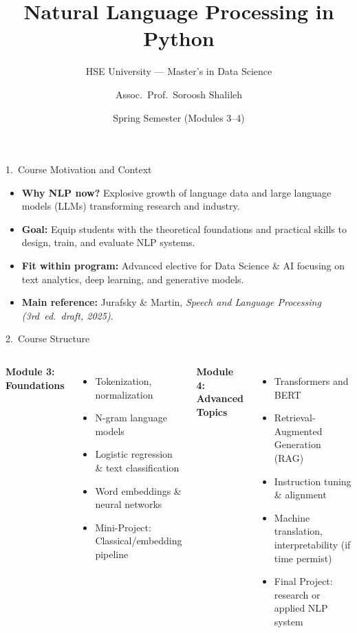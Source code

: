 \documentclass[aspectratio=169]{beamer}
\title[NLP in Python]{\textbf{Natural Language Processing in Python}}
\subtitle{HSE University --- Master’s in Data Science }
\author[Shalileh]{Assoc.\ Prof.\ Soroosh Shalileh}
\institute[HSE \& Sber]{
\inst{2}Higher School of Economics (HSE University)
\and 
\inst{1} Executive director of SberIndex, SberBank
}
\date{Spring Semester (Modules 3--4)}
\begin{document}
\begin{frame}
  \titlepage
\end{frame}

\begin{frame}{1.~Course Motivation and Context}
\begin{itemize}
  \item \textbf{Why NLP now?} Explosive growth of language data and large language models (LLMs) transforming research and industry.
  \item \textbf{Goal:} Equip students with the theoretical foundations and practical skills to design, train, and evaluate NLP systems.
  \item \textbf{Fit within program:} Advanced elective for Data Science \& AI focusing on text analytics, deep learning, and generative models.
  \item \textbf{Main reference:} Jurafsky \& Martin, \emph{Speech and Language Processing (3rd~ed.\ draft, 2025)}.
\end{itemize}
\end{frame}

\begin{frame}{2.~Course Structure}
\begin{columns}[T]
\textbf{Module 3: Foundations}
\begin{itemize}
  \item Tokenization, normalization
  \item N-gram language models
  \item Logistic regression \& text classification
  \item Word embeddings \& neural networks
  \item Mini-Project: Classical/embedding pipeline
\end{itemize}

\textbf{Module 4: Advanced Topics }
\begin{itemize}
  \item Transformers and BERT
  \item Retrieval-Augmented Generation (RAG)
  \item Instruction tuning \& alignment
  \item Machine translation, interpretability (if time permist)
  \item Final Project: research or applied NLP system
\end{itemize}
\end{columns}
\end{frame}
\end{document}
